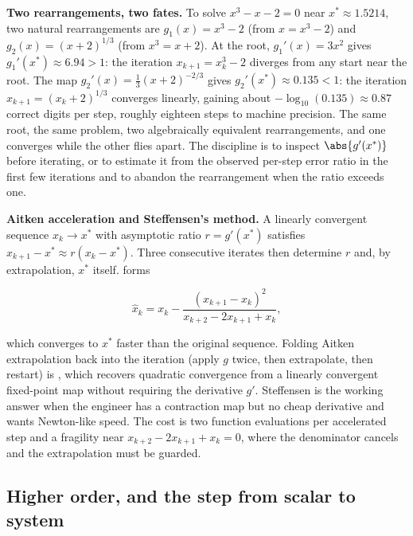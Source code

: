 \begin{example}
\textbf{Two rearrangements, two fates.} To solve $x^{3} - x - 2 =
0$ near $x^{*} \approx 1.5214$, two natural rearrangements are
$g_{1}(x) = x^{3} - 2$ (from $x = x^{3} - 2$) and $g_{2}(x) =
(x + 2)^{1/3}$ (from $x^{3} = x + 2$). At the root, $g_{1}'(x) =
3x^{2}$ gives $g_{1}'(x^{*}) \approx 6.94 > 1$: the iteration
$x_{k+1} = x_{k}^{3} - 2$ diverges from any start near the root.
The map $g_{2}'(x) = \tfrac{1}{3}(x + 2)^{-2/3}$ gives
$g_{2}'(x^{*}) \approx 0.135 < 1$: the iteration $x_{k+1} =
(x_{k} + 2)^{1/3}$ converges linearly, gaining about
$-\log_{10}(0.135) \approx 0.87$ correct digits per step, roughly
eighteen steps to machine precision. The same root, the same
problem, two algebraically equivalent rearrangements, and one
converges while the other flies apart. The discipline is to inspect
$\abs{g'(x^{*})}$ before iterating, or to estimate it from the
observed per-step error ratio in the first few iterations and to
abandon the rearrangement when the ratio exceeds one.
\end{example}

\begin{mastery}
\textbf{Aitken acceleration and Steffensen's method.} A linearly
convergent sequence $x_{k} \to x^{*}$ with asymptotic ratio $r =
g'(x^{*})$ satisfies $x_{k+1} - x^{*} \approx r(x_{k} - x^{*})$. Three
consecutive iterates then determine $r$ and, by extrapolation,
$x^{*}$ itself.  forms

\[
\hat{x}_{k} = x_{k} - \frac{(x_{k+1} - x_{k})^{2}}
{x_{k+2} - 2x_{k+1} + x_{k}},
\]

which converges to $x^{*}$ faster than the original sequence. Folding
Aitken extrapolation back into the iteration (apply $g$ twice, then
extrapolate, then restart) is , which
recovers quadratic convergence from a linearly convergent fixed-point
map without requiring the derivative $g'$. Steffensen is the
working answer when the engineer has a contraction map but no cheap
derivative and wants Newton-like speed. The cost is two function
evaluations per accelerated step and a fragility near $x_{k+2} -
2x_{k+1} + x_{k} = 0$, where the denominator cancels and the
extrapolation must be guarded.
\end{mastery}

\subsection{Higher order, and the step from scalar to system}

